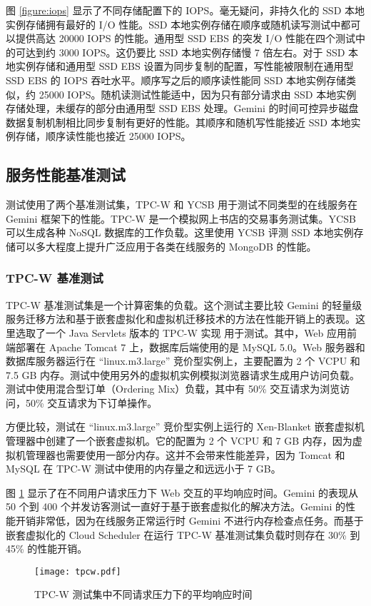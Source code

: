 图 \ref{figure:iops} 显示了不同存储配置下的 IOPS。毫无疑问，非持久化的 SSD 本地实例存储拥有最好的 I/O 性能。SSD 本地实例存储在顺序或随机读写测试中都可以提供高达 20000 IOPS 的性能。通用型 SSD EBS 的突发 I/O 性能在四个测试中的可达到约 3000 IOPS。这仍要比 SSD 本地实例存储慢 7 倍左右。对于 SSD 本地实例存储和通用型 SSD EBS 设置为同步复制的配置，写性能被限制在通用型 SSD EBS 的 IOPS 吞吐水平。顺序写之后的顺序读性能同 SSD 本地实例存储类似，约 25000 IOPS。随机读测试性能适中，因为只有部分请求由 SSD 本地实例存储处理，未缓存的部分由通用型 SSD EBS 处理。Gemini 的时间可控异步磁盘数据复制机制相比同步复制有更好的性能。其顺序和随机写性能接近 SSD 本地实例存储，顺序读性能也接近 25000 IOPS。

\subsection{服务性能基准测试}
测试使用了两个基准测试集，TPC-W 和 YCSB 用于测试不同类型的在线服务在 Gemini 框架下的性能。TPC-W 是一个模拟网上书店的交易事务测试集。YCSB 可以生成各种 NoSQL 数据库的工作负载。这里使用 YCSB 评测 SSD 本地实例存储可以多大程度上提升广泛应用于各类在线服务的 MongoDB 的性能。

\subsubsection{TPC-W 基准测试}
TPC-W 基准测试集是一个计算密集的负载。这个测试主要比较 Gemini 的轻量级服务迁移方法和基于嵌套虚拟化和虚拟机迁移技术的方法在性能开销上的表现。这里选取了一个 Java Servlets 版本的 TPC-W 实现 \cite{JAVATPCW:2014} 用于测试。其中，Web 应用前端部署在 Apache Tomcat 7 上，数据库后端使用的是 MySQL 5.0。Web 服务器和数据库服务器运行在 ``linux.m3.large'' 竞价型实例上，主要配置为 2 个 VCPU 和 7.5 GB 内存。测试中使用另外的虚拟机实例模拟浏览器请求生成用户访问负载。测试中使用混合型订单（Ordering Mix）负载，其中有 50\% 交互请求为浏览访问，50\% 交互请求为下订单操作。

方便比较，测试在 ``linux.m3.large'' 竞价型实例上运行的 Xen-Blanket \cite{Williams:2012:XVO:2168836.2168849} 嵌套虚拟机管理器中创建了一个嵌套虚拟机。它的配置为 2 个 VCPU 和 7 GB 内存，因为虚拟机管理器也需要使用一部分内存。这并不会带来性能差异，因为 Tomcat 和 MySQL 在 TPC-W 测试中使用的内存量之和远远小于 7 GB。

图 \ref{figure:tpcw} 显示了在不同用户请求压力下 Web 交互的平均响应时间。Gemini 的表现从 50 个到 400 个并发访客测试一直好于基于嵌套虚拟化的解决方法。Gemini 的性能开销非常低，因为在线服务正常运行时 Gemini 不进行内存检查点任务。而基于嵌套虚拟化的 Cloud Scheduler 在运行 TPC-W 基准测试集负载时则存在 30\% 到 45\% 的性能开销。
\begin{figure}[]
  \centering
  \texttt{[image: tpcw.pdf]}
  \caption{TPC-W 测试集中不同请求压力下的平均响应时间}
  \label{figure:tpcw}
\end{figure}

